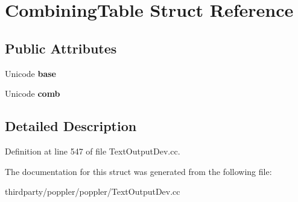 \hypertarget{struct_combining_table}{}\section{Combining\+Table Struct Reference}
\label{struct_combining_table}
\subsection*{Public Attributes}
\begin{DoxyCompactItemize}
\item 
\mbox{\label{struct_combining_table_afcb2344f103b110ad8376c7189f82a39}} 
Unicode {\bfseries base}
\item 
\mbox{\label{struct_combining_table_a2831a4cdfe7940420085c907e9070d84}} 
Unicode {\bfseries comb}
\end{DoxyCompactItemize}


\subsection{Detailed Description}


Definition at line 547 of file Text\+Output\+Dev.\+cc.



The documentation for this struct was generated from the following file\+:\begin{DoxyCompactItemize}
\item 
thirdparty/poppler/poppler/Text\+Output\+Dev.\+cc\end{DoxyCompactItemize}
